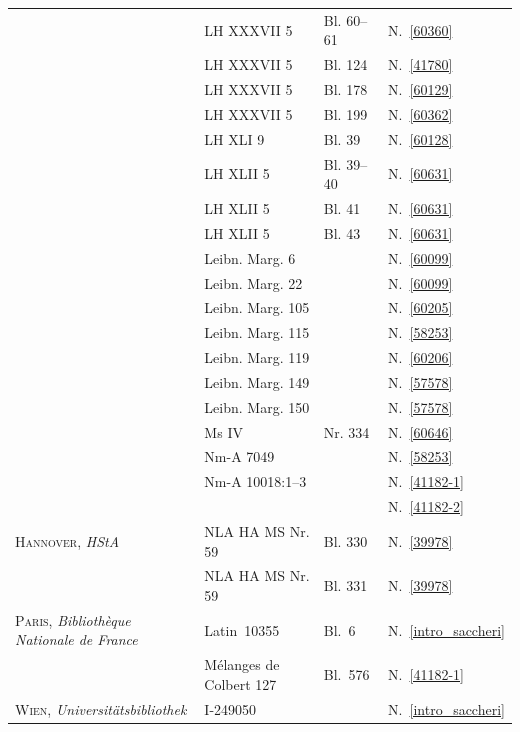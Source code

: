 \begin{longtable}{llll}
& LH XXXVII 5 & Bl. 60--61 & N.~\ref{60360}\\

& LH XXXVII 5 & Bl. 124 & N.~\ref{41780}\\

& LH XXXVII 5 & Bl. 178\textendash 179 & N.~\ref{60129}\\

& LH XXXVII 5 & Bl. 199 & N.~\ref{60362}\\

& LH XLI 9 & Bl. 39 & N.~\ref{60128}\\

& LH XLII 5 & Bl. 39--40 & N.~\ref{60631}\\

& LH XLII 5 & Bl. 41 & N.~\ref{60631}\\

& LH XLII 5 & Bl. 43 & N.~\ref{60631}\\

& Leibn. Marg. 6 &  & N.~\ref{60099}\\

& Leibn. Marg. 22 &  & N.~\ref{60099}\\

& Leibn. Marg. 105 &  & N.~\ref{60205}\\

& Leibn. Marg. 115 &  & N.~\ref{58253}\\

& Leibn. Marg. 119 &  & N.~\ref{60206}\\

& Leibn. Marg. 149 &  & N.~\ref{57578}\\

& Leibn. Marg. 150 &  & N.~\ref{57578}\\

& Ms IV & Nr. 334 & N.~\ref{60646}\\



& Nm-A 7049 & & N.~\ref{58253}\\	%

& Nm-A 10018:1–3 & & N.~\ref{41182-1}\\
							& & & N.~\ref{41182-2}\\

\textsc{Hannover}, \textit{HStA}

& NLA HA MS Nr. 59 & Bl. 330 & N.~\ref{39978}\\

& NLA HA MS Nr. 59 & Bl. 331 & N.~\ref{39978}\\

	\textsc{Paris}, \textit{Bibliothèque Nationale de France}

& Latin~10355 & Bl.~6\textendash7 & N.~\ref{intro_saccheri}\\

& Mélanges de Colbert 127 & Bl.~576 & N.~\ref{41182-1}\\


	\textsc{Wien}, \textit{Universitätsbibliothek}

& I-249050 & & N.~\ref{intro_saccheri}\\%

\end{longtable}



